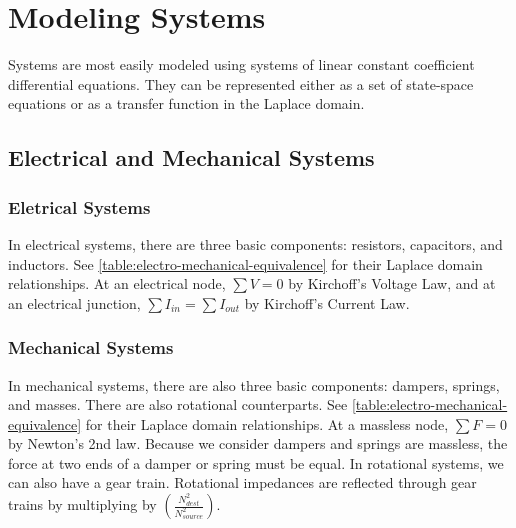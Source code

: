 \section{Modeling Systems}
Systems are most easily modeled using systems of linear constant coefficient differential equations.
They can be represented either as a set of state-space equations or as a transfer function in the Laplace domain.
\subsection{Electrical and Mechanical Systems}
\subsubsection{Eletrical Systems} 
In electrical systems, there are three basic components: resistors, capacitors, and inductors. See \cref{table:electro-mechanical-equivalence} for their Laplace domain relationships.
At an electrical node, $\sum V = 0$ by Kirchoff's Voltage Law, and at an electrical junction, $\sum I_{in} = \sum I_{out}$ by Kirchoff's Current Law.
\subsubsection{Mechanical Systems}
In mechanical systems, there are also three basic components: dampers, springs, and masses. 
There are also rotational counterparts. See \cref{table:electro-mechanical-equivalence} for their Laplace domain relationships.
At a massless node, $\sum F=0$ by Newton's 2nd law.
Because we consider dampers and springs are massless, the force at two ends of a damper or spring must be equal.
In rotational systems, we can also have a gear train. Rotational impedances are reflected through gear trains by multiplying by $\left(\frac{N^2_{dest}}{N^2_{source}}\right)$.
